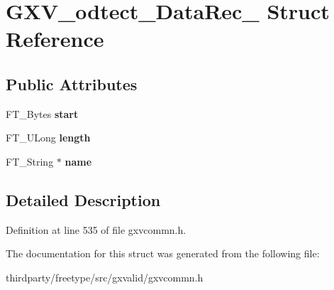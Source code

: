 \hypertarget{struct_g_x_v__odtect___data_rec__}{}\section{G\+X\+V\+\_\+odtect\+\_\+\+Data\+Rec\+\_\+ Struct Reference}
\label{struct_g_x_v__odtect___data_rec__}
\subsection*{Public Attributes}
\begin{DoxyCompactItemize}
\item 
\mbox{\label{struct_g_x_v__odtect___data_rec___ac6c97acde7851edfcee409675400cac0}} 
F\+T\+\_\+\+Bytes {\bfseries start}
\item 
\mbox{\label{struct_g_x_v__odtect___data_rec___ab64ce9893f2919bbd09625a25ee0c4ad}} 
F\+T\+\_\+\+U\+Long {\bfseries length}
\item 
\mbox{\label{struct_g_x_v__odtect___data_rec___a912965e9b4d5cc2e2624ee5ca2510d03}} 
F\+T\+\_\+\+String $\ast$ {\bfseries name}
\end{DoxyCompactItemize}


\subsection{Detailed Description}


Definition at line 535 of file gxvcommn.\+h.



The documentation for this struct was generated from the following file\+:\begin{DoxyCompactItemize}
\item 
thirdparty/freetype/src/gxvalid/gxvcommn.\+h\end{DoxyCompactItemize}
